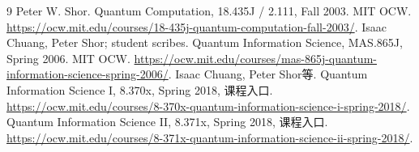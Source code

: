 \begin{thebibliography}{9}
 Peter W. Shor. Quantum Computation, 18.435J / 2.111, Fall 2003. MIT OCW. \url{https://ocw.mit.edu/courses/18-435j-quantum-computation-fall-2003/}.
 Isaac Chuang, Peter Shor; student scribes. Quantum Information Science, MAS.865J, Spring 2006. MIT OCW. \url{https://ocw.mit.edu/courses/mas-865j-quantum-information-science-spring-2006/}.
 Isaac Chuang, Peter Shor等. Quantum Information Science I, 8.370x, Spring 2018, 课程入口. \url{https://ocw.mit.edu/courses/8-370x-quantum-information-science-i-spring-2018/}.
 Quantum Information Science II, 8.371x, Spring 2018, 课程入口. \url{https://ocw.mit.edu/courses/8-371x-quantum-information-science-ii-spring-2018/}.
\end{thebibliography}
